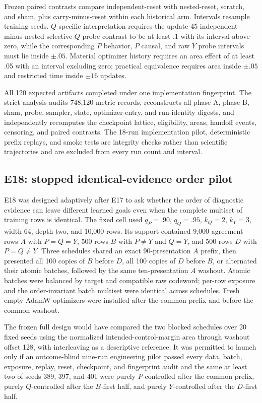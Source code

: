 \documentclass[11pt,a4paper]{article}
\begin{document}
Frozen paired contrasts compare independent-reset with nested-reset, scratch, and sham, plus carry-minus-reset within each historical arm. Intervals resample training seeds. $Q$-specific interpretation requires the update-45 independent-minus-nested selective-$Q$ probe contrast to be at least .1 with its interval above zero, while the corresponding $P$ behavior, $P$ causal, and raw $Y$ probe intervals must lie inside $\pm.05$. Material optimizer history requires an area effect of at least .05 with an interval excluding zero; practical equivalence requires area inside $\pm.05$ and restricted time inside $\pm16$ updates.

All 120 expected artifacts completed under one implementation fingerprint. The strict analysis audits 748,120 metric records, reconstructs all phase-A, phase-B, sham, probe, sampler, state, optimizer-entry, and run-identity digests, and independently recomputes the checkpoint lattice, eligibility, areas, handoff events, censoring, and paired contrasts. The 18-run implementation pilot, deterministic prefix replays, and smoke tests are integrity checks rather than scientific trajectories and are excluded from every run count and interval.

\subsection{E18: stopped identical-evidence order pilot}

E18 was designed adaptively after E17 to ask whether the order of diagnostic evidence can leave different learned goals even when the complete multiset of training rows is identical. The fixed cell used $q_P=.90$, $q_Q=.95$, $k_Q=2$, $k_Y=3$, width 64, depth two, and 10,000 rows. Its support contained 9,000 agreement rows $A$ with $P=Q=Y$, 500 rows $B$ with $P\ne Y$ and $Q=Y$, and 500 rows $D$ with $P=Q\ne Y$. Three schedules shared an exact 90-presentation $A$ prefix, then presented all 100 copies of $B$ before $D$, all 100 copies of $D$ before $B$, or alternated their atomic batches, followed by the same ten-presentation $A$ washout. Atomic batches were balanced by target and compatible raw codeword; per-row exposure and the order-invariant batch multiset were identical across schedules. Fresh empty AdamW optimizers were installed after the common prefix and before the common washout.

The frozen full design would have compared the two blocked schedules over 20 fixed seeds using the normalized intended-control-margin area through washout offset 128, with interleaving as a descriptive reference. It was permitted to launch only if an outcome-blind nine-run engineering pilot passed every data, batch, exposure, replay, reset, checkpoint, and fingerprint audit and the same at least two of seeds 389, 397, and 401 were purely $P$-controlled after the common prefix, purely $Q$-controlled after the $B$-first half, and purely $Y$-controlled after the $D$-first half.
\end{document}

